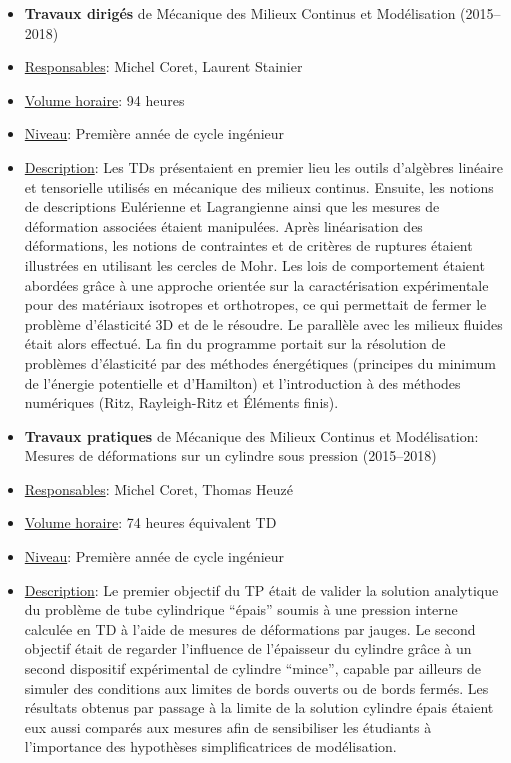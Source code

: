 \begin{itemize}
\item \textbf{Travaux dirigés} de Mécanique des Milieux Continus et Modélisation (2015--2018)
\item[] \underline{Responsables}: Michel Coret, Laurent Stainier
\item[] \underline{Volume horaire}: 94 heures
\item[] \underline{Niveau}: Première année de cycle ingénieur
\item[] \underline{Description}: Les TDs présentaient en premier lieu les outils d'algèbres linéaire et tensorielle utilisés en mécanique des milieux continus. Ensuite, les notions de descriptions Eulérienne et Lagrangienne ainsi que les mesures de déformation associées étaient manipulées. Après linéarisation des déformations, les notions de contraintes et de critères de ruptures étaient illustrées en utilisant les cercles de Mohr. Les lois de comportement étaient abordées grâce à une approche orientée sur la caractérisation expérimentale pour des matériaux isotropes et orthotropes, ce qui permettait de fermer le problème d'élasticité 3D et de le résoudre. Le parallèle avec les milieux fluides était alors effectué. La fin du programme portait sur la résolution de problèmes d'élasticité par des méthodes énergétiques (principes du minimum de l'énergie potentielle et d'Hamilton) et l'introduction à des méthodes numériques (Ritz, Rayleigh-Ritz et {\'E}léments finis).

\item \textbf{Travaux pratiques} de Mécanique des Milieux Continus et Modélisation: Mesures de déformations sur un cylindre sous pression (2015--2018)
\item[] \underline{Responsables}: Michel Coret, Thomas Heuzé
\item[] \underline{Volume horaire}: 74 heures équivalent TD
\item[] \underline{Niveau}: Première année de cycle ingénieur
\item[] \underline{Description}: Le premier objectif du TP était de valider la solution analytique du problème de tube cylindrique ``épais'' soumis à une pression interne calculée en TD à l'aide de mesures de déformations par jauges. Le second objectif était de regarder l'influence de l'épaisseur du cylindre grâce à un second dispositif expérimental de cylindre ``mince'', capable par ailleurs de simuler des conditions aux limites de bords ouverts ou de bords fermés. Les résultats obtenus par passage à la limite de la solution cylindre épais étaient eux aussi comparés aux mesures afin de sensibiliser les étudiants à l'importance des hypothèses simplificatrices de modélisation. 
  

\end{itemize}
